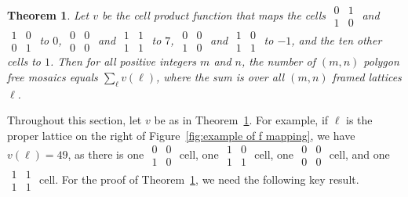 \documentclass[12pt]{article}
\theoremstyle{plain}
\newtheorem{thm}{Theorem}[section]
\theoremstyle{remark}
\theoremstyle{definition}
\theoremstyle{remark}
\theoremstyle{definition}
\begin{document}
\begin{thm}
Let $v$ be the cell product function that maps the cells $\begin{smallmatrix}0 & 1\\1 & 0\end{smallmatrix}$ and $\begin{smallmatrix}1 & 0\\0 & 1\end{smallmatrix}$ to $0$, $\begin{smallmatrix}0 & 0\\0 & 0\end{smallmatrix}$ and $\begin{smallmatrix}1 & 1\\1 & 1\end{smallmatrix}$ to $7$, $\begin{smallmatrix}0 & 0\\1 & 0\end{smallmatrix}$ and $\begin{smallmatrix}1 & 0\\1 & 1\end{smallmatrix}$ to $-1$, and the ten other cells to $1$. Then for all positive integers $m$ and $n$, the number of $\left(m,n\right)$ polygon free mosaics equals $\sum_{\ell}v\left(\ell\right)$, where the sum is over all $\left(m,n\right)$ framed lattices $\ell$.
\label{thm: polygon free summation}
\end{thm}

Throughout this section, let $v$ be as in Theorem~\ref{thm: polygon free summation}. For example, if $\ell$ is the proper lattice on the right of Figure~\ref{fig:example of f mapping}, we have $v(\ell) = 49$, as there is one $\begin{smallmatrix} 0 & 0 \\ 1 & 0 \end{smallmatrix}$ cell, one $\begin{smallmatrix} 1 & 0 \\ 1 & 1 \end{smallmatrix}$ cell, one $\begin{smallmatrix} 0 & 0 \\ 0 & 0 \end{smallmatrix}$ cell, and one $\begin{smallmatrix} 1 & 1 \\ 1 & 1 \end{smallmatrix}$ cell. For the proof of Theorem~\ref{thm: polygon free summation}, we need the following key result.
\end{document}
